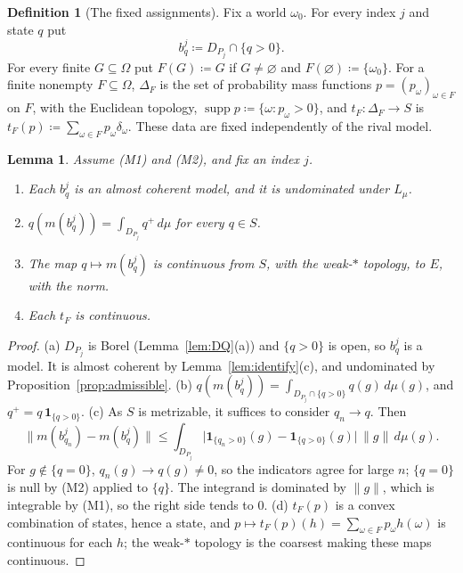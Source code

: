 \documentclass[11pt]{article}
\newtheorem{lemma}[theorem]{Lemma}
\theoremstyle{definition}
\newtheorem{definition}[theorem]{Definition}
\newcommand{\one}{\mathbf 1}
\newcommand{\Lmu}{L_\mu}
\DeclareMathOperator{\supp}{supp}
\begin{document}
\begin{definition}[The fixed assignments]\label{def:assignments}
Fix a world $\omega_0$. For every index $j$ and state $q$ put
\[
b^j_q\coloneqq D_{P_j}\cap\{q>0\}.
\]
For every finite $G\subseteq\Omega$ put $F(G)\coloneqq G$ if $G\ne\varnothing$ and $F(\varnothing)\coloneqq\{\omega_0\}$. For a finite nonempty $F\subseteq\Omega$, $\Delta_F$ is the set of probability mass functions $p=(p_\omega)_{\omega\in F}$ on $F$, with the Euclidean topology, $\supp p\coloneqq\{\omega:p_\omega>0\}$, and $t_F:\Delta_F\to S$ is $t_F(p)\coloneqq\sum_{\omega\in F}p_\omega\delta_\omega$. These data are fixed independently of the rival model.
\end{definition}

\begin{lemma}\label{lem:assigned}
Assume (M1) and (M2), and fix an index $j$.
\begin{enumerate}[label=(\alph*)]
\item Each $b^j_q$ is an almost coherent model, and it is undominated under $\Lmu$.
\item $q(m(b^j_q))=\int_{D_{P_j}}q^+\,d\mu$ for every $q\in S$.
\item The map $q\mapsto m(b^j_q)$ is continuous from $S$, with the weak-$\ast$ topology, to $E$, with the norm.
\item Each $t_F$ is continuous.
\end{enumerate}
\end{lemma}
\begin{proof}
(a) $D_{P_j}$ is Borel (Lemma~\ref{lem:DQ}(a)) and $\{q>0\}$ is open, so $b^j_q$ is a model. It is almost coherent by Lemma~\ref{lem:identify}(c), and undominated by Proposition~\ref{prop:admissible}.
(b) $q(m(b^j_q))=\int_{D_{P_j}\cap\{q>0\}}q(g)\,d\mu(g)$, and $q^+=q\,\one_{\{q>0\}}$.
(c) As $S$ is metrizable, it suffices to consider $q_n\to q$. Then
\[
\bigl\|m(b^j_{q_n})-m(b^j_q)\bigr\|\le\int_{D_{P_j}}\bigl|\one_{\{q_n>0\}}(g)-\one_{\{q>0\}}(g)\bigr|\,\|g\|\,d\mu(g).
\]
For $g\notin\{q=0\}$, $q_n(g)\to q(g)\ne0$, so the indicators agree for large $n$; $\{q=0\}$ is null by (M2) applied to $\{q\}$. The integrand is dominated by $\|g\|$, which is integrable by (M1), so the right side tends to $0$.
(d) $t_F(p)$ is a convex combination of states, hence a state, and $p\mapsto t_F(p)(h)=\sum_{\omega\in F}p_\omega h(\omega)$ is continuous for each $h$; the weak-$\ast$ topology is the coarsest making these maps continuous.
\end{proof}
\end{document}
